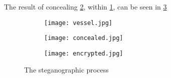 The result of concealing \ref{img2}, within \ref{img1}, can be seen in \ref{img3}

\begin{figure}[]
	\centering
	\begin{subfigure}[b]{.3\linewidth}
		\texttt{[image: vessel.jpg]}
		\label{img1}
	\end{subfigure}
	\hspace{.02\linewidth}
	\begin{subfigure}[b]{.3\linewidth}
		\texttt{[image: concealed.jpg]}
		\label{img2}
	\end{subfigure}
	\hspace{.02\linewidth}

	\begin{subfigure}[b]{.4\linewidth}
		\texttt{[image: encrypted.jpg]}
		\label{img3}
	\end{subfigure}
	\caption{The steganographic process}\label{LSBDemo}
\end{figure} 


